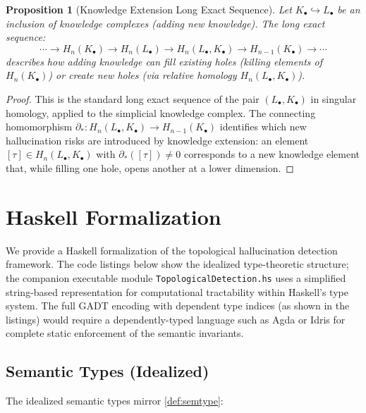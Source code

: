 \documentclass[11pt,a4paper]{article}
\theoremstyle{plain}
\newtheorem{proposition}[theorem]{Proposition}
\theoremstyle{definition}
\theoremstyle{remark}
\begin{document}
\begin{proposition}[Knowledge Extension Long Exact Sequence]
\label{prop:les}
Let $K_\bullet \hookrightarrow L_\bullet$ be an inclusion of knowledge complexes (adding new knowledge). The long exact sequence:
\[
\cdots \to H_n(K_\bullet) \to H_n(L_\bullet) \to H_n(L_\bullet, K_\bullet) \to H_{n-1}(K_\bullet) \to \cdots
\]
describes how adding knowledge can fill existing holes (killing elements of $H_n(K_\bullet)$) or create new holes (via relative homology $H_n(L_\bullet, K_\bullet)$).
\end{proposition}

\begin{proof}
This is the standard long exact sequence of the pair $(L_\bullet, K_\bullet)$ in singular homology, applied to the simplicial knowledge complex. The connecting homomorphism $\partial_*: H_n(L_\bullet, K_\bullet) \to H_{n-1}(K_\bullet)$ identifies which new hallucination risks are introduced by knowledge extension: an element $[\tau] \in H_n(L_\bullet, K_\bullet)$ with $\partial_*([\tau]) \neq 0$ corresponds to a new knowledge element that, while filling one hole, opens another at a lower dimension.
\end{proof}


\section{Haskell Formalization}
\label{sec:haskell}

We provide a Haskell formalization of the topological hallucination detection framework. The code listings below show the idealized type-theoretic structure; the companion executable module \texttt{TopologicalDetection.hs} uses a simplified string-based representation for computational tractability within Haskell's type system. The full GADT encoding with dependent type indices (as shown in the listings) would require a dependently-typed language such as Agda or Idris for complete static enforcement of the semantic invariants.

\subsection{Semantic Types (Idealized)}

The idealized semantic types mirror \cref{def:semtype}:
\end{document}
